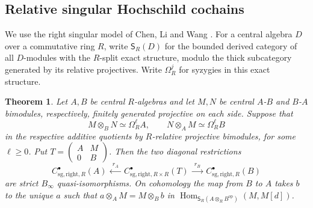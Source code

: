 \documentclass[12pt,a4paper,english,reqno]{amsart}
\numberwithin{equation}{section}
\theoremstyle{plain}
\newtheorem{theorem}{Theorem}[section]
\theoremstyle{definition}
\begin{document}
\subsection{Relative singular Hochschild cochains}
\label{subsec:relative-singular-braces}

We use the right singular model of Chen, Li and Wang
\cite[Sections~8.1 and~9.2--9.4]{ChenLiWangBInfinity}. For a
central algebra $D$ over a commutative ring $R$, write
$\mathsf S_R(D)$ for the bounded derived category of all
$D$-modules with the $R$-split exact structure, modulo the
thick subcategory generated by its relative projectives.
Write $\Omega_R^j$ for syzygies in this exact structure.

\begin{theorem}\label{thm:relative-singular-braces}
Let $A,B$ be central $R$-algebras and let $M,N$ be central
$A$-$B$ and $B$-$A$ bimodules, respectively, finitely generated
projective on each side. Suppose that
\[
 M\otimes_BN\simeq\Omega_R^\ell A,\qquad
 N\otimes_AM\simeq\Omega_R^\ell B
\]
in the respective additive quotients by $R$-relative projective
bimodules, for some $\ell\geq0$. Put
$T=\left(\begin{smallmatrix} A&M\\0&B\end{smallmatrix}\right)$.
Then the two diagonal restrictions
\[
 C^\bullet_{\mathrm{sg},\mathrm{right},R}(A)
 \ \xleftarrow{\ r_A\ }\
 C^\bullet_{\mathrm{sg},\mathrm{right},R\times R}(T)
 \ \xrightarrow{\ r_B\ }\
 C^\bullet_{\mathrm{sg},\mathrm{right},R}(B)
\]
are strict $B_\infty$ quasi-isomorphisms. On cohomology the map
from $B$ to $A$ takes $b$ to the unique $a$ such that
$a\otimes_A M=M\otimes_B b$ in
$\operatorname{Hom}_{\mathsf S_R(A\otimes_R B^{\mathrm{op}})}
(M,M[d])$.
\end{theorem}
\end{document}

